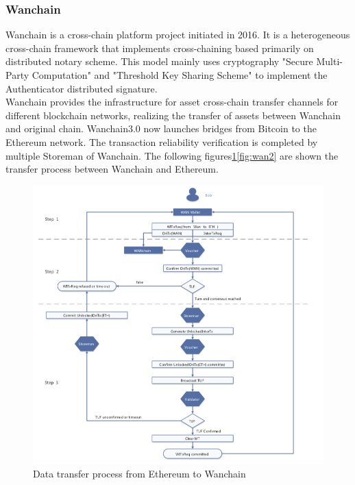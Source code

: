 \subsubsection{Wanchain}
\noindent Wanchain\cite{wanchain.org} is a cross-chain platform project initiated in 2016. It is a heterogeneous cross-chain framework that implements cross-chaining based primarily on distributed notary scheme. This model mainly uses cryptography "Secure Multi-Party Computation" and "Threshold Key Sharing Scheme" to implement the Authenticator distributed signature.\\

\noindent Wanchain provides the infrastructure for asset cross-chain transfer channels for different blockchain networks, realizing the transfer of assets between Wanchain and original chain. Wanchain3.0 now launches bridges from Bitcoin to the Ethereum network. The transaction reliability verification is completed by multiple Storeman of Wanchain. The following figures\ref{fig:wan1}\ref{fig:wan2} are shown the transfer process between Wanchain and Ethereum.
        \begin{figure}[H]
        \includegraphics[width=1\textwidth]{./figures/ethtowan.png}
        \centering
        \caption{{Data transfer process from Ethereum to Wanchain}\protect\footnotemark}
        \centering
        \label{fig:wan1}
        
        \end{figure}
